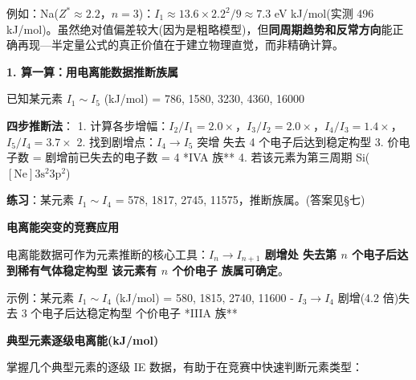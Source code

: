 例如：Na(\(Z^*\approx2.2\)，\(n=3\))：\(I_1 \approx 13.6 \times 2.2^2/9 \approx 7.3\) eV  kJ/mol(实测 496 kJ/mol)。虽然绝对值偏差较大(因为是粗略模型)，但\textbf{同周期趋势和反常方向}能正确再现---半定量公式的真正价值在于建立物理直觉，而非精确计算。

\textbf{1. 算一算：用电离能数据推断族属}

已知某元素 \(I_1\sim I_5\) (kJ/mol) = 786, 1580, 3230, 4360, 16000

\textbf{四步推断法}：
1. 计算各步增幅：\(I_2/I_1=2.0\times\)，\(I_3/I_2=2.0\times\)，\(I_4/I_3=1.4\times\)，\(I_5/I_4=3.7\times\)
2. 找到剧增点：\(I_4\to I_5\) 突增 \箭 失去 4 个电子后达到稳定构型
3. 价电子数 = 剧增前已失去的电子数 = 4 \箭 **IVA 族**
4. 若该元素为第三周期 \箭 Si(\([\mathrm{Ne}]3\mathrm{s}^2 3\mathrm{p}^2\))

\textbf{练习}：某元素 \(I_1\sim I_4\) = 578, 1817, 2745, 11575，推断族属。(答案见§七)

\textbf{电离能突变的竞赛应用}

电离能数据可作为元素推断的核心工具：\textbf{\(I_n \to I_{n+1}\) 剧增处 \箭 失去第 \(n\) 个电子后达到稀有气体稳定构型 \箭 该元素有 \(n\) 个价电子 \箭 族属可确定}。

示例：某元素 \(I_1\sim I_4\) (kJ/mol) = 580, 1815, 2740, 11600
- \(I_3\to I_4\) 剧增(4.2 倍)\箭 失去 3 个电子后达稳定构型  个价电子 \箭 **IIIA 族**

\textbf{典型元素逐级电离能(kJ/mol)}

掌握几个典型元素的逐级 IE 数据，有助于在竞赛中快速判断元素类型：

